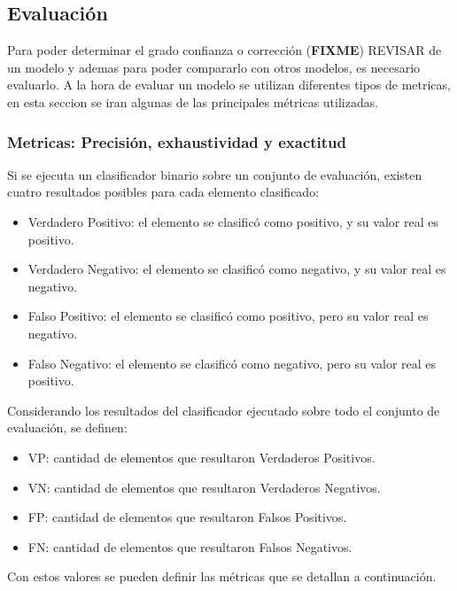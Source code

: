 \documentclass[a4paper,11pt,spanish]{book}
\newcommand*{\FIXME}[1]{{(\textbf{FIXME}) {#1}}}
\begin{document}
      \subsection{Evaluación}
	Para poder determinar el grado confianza o corrección \FIXME{REVISAR} de un modelo y ademas para poder compararlo con otros modelos, es necesario evaluarlo. 
	A la hora de evaluar un modelo se utilizan diferentes tipos de metricas, en esta seccion se iran algunas de las principales métricas utilizadas.    

	\subsubsection {Metricas: Precisión, exhaustividad y exactitud}
	  Si se ejecuta un clasificador binario sobre un conjunto de evaluación, existen cuatro resultados posibles para cada elemento clasificado:
	  \begin{itemize}	
	    \item Verdadero Positivo: el elemento se clasificó como positivo, y su valor real es positivo.
	    \item Verdadero Negativo: el elemento se clasificó como negativo, y su valor real es negativo.
	    \item Falso Positivo: el elemento se clasificó como positivo, pero su valor real es negativo.
	    \item Falso Negativo: el elemento se clasificó como negativo, pero su valor real es positivo.
	  \end{itemize}
	  
	  Considerando los resultados del clasificador ejecutado sobre todo el conjunto de evaluación, se definen:
	  \begin{itemize}	
	    \item VP: cantidad de elementos que resultaron Verdaderos Positivos.
	    \item VN: cantidad de elementos que resultaron Verdaderos Negativos.
	    \item FP: cantidad de elementos que resultaron Falsos Positivos.
	    \item FN: cantidad de elementos que resultaron Falsos Negativos.
	  \end{itemize}	  
	  
	  Con estos valores se pueden definir las métricas que se detallan a continuación.
	  
\end{document}
